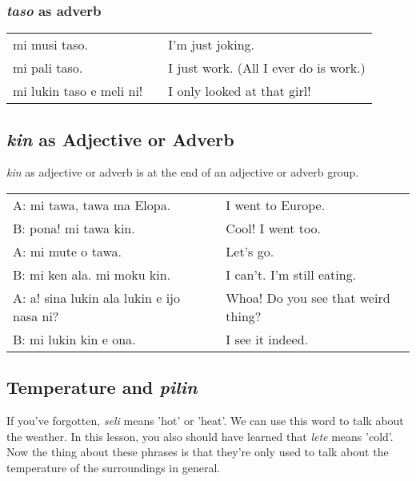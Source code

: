 {\subsubsection*{\textit{taso} as adverb}
%
\begin{supertabular}{p{5,5cm}|ll}
mi musi taso. && I'm just joking. \\
mi pali taso. && I just work. (All I ever do is work.) \\ 
mi lukin taso e meli ni! && I only looked at that girl!  \\
\end{supertabular} 
%
\subsection*{\textit{kin} as Adjective or Adverb}
%
%
\textit{kin} as adjective or adverb is at the end of an adjective or adverb group.

\begin{supertabular}{p{5,5cm}|ll}
A: mi tawa, tawa ma Elopa. && I went to Europe. \\
B: pona! mi tawa kin. && Cool! I went too. \\
A: mi mute o tawa. && Let's go. \\
B: mi ken ala. mi moku kin. && I can't. I'm still eating. \\
A: a! sina lukin ala lukin e ijo nasa ni? && Whoa! Do you see that weird thing? \\
B: mi lukin kin e ona. && I see it indeed. \\
\end{supertabular} 

%
%
%
%
\subsection*{Temperature and \textit{pilin}}
%
%
If you've forgotten, \textit{seli} means 'hot' or 'heat'. 
We can use this word to talk about the weather. 
In this lesson, you also should have learned that \textit{lete} means 'cold'. 
Now the thing about these phrases is that they're only used to talk about the temperature of the surroundings in general. 

}
